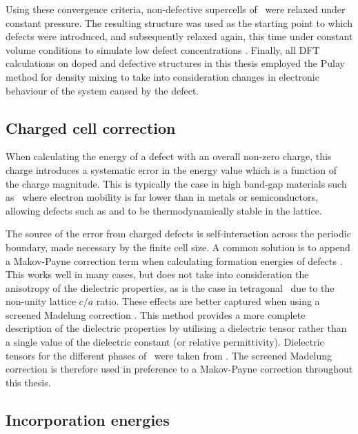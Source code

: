 Using these convergence criteria, non-defective supercells of \zirconia\ were relaxed under constant pressure. The resulting structure was used as the starting point to which defects were introduced, and subsequently relaxed again, this time under constant volume conditions to simulate low defect concentrations \cite{Murphy2014, Bell2015}. Finally, all DFT calculations on doped and defective structures in this thesis employed the Pulay method for density mixing \cite{Pulay1980} to take into consideration changes in electronic behaviour of the system caused by the defect.

\subsection{Charged cell correction} \label{charged_cell_correction}

When calculating the energy of a defect with an overall non-zero charge, this charge introduces a systematic error in the energy value which is a function of the charge magnitude. This is typically the case in high band-gap materials such as \zirconia\ where electron mobility is far lower than in metals or semiconductors, allowing defects such as  and  to be thermodynamically stable in the lattice. 

The source of the error from charged defects is self-interaction across the periodic boundary, made necessary by the finite cell size. A common solution is to append a Makov-Payne correction term when calculating formation energies of defects \cite{Makov1995, Makov1996}. This works well in many cases, but does not take into consideration the anisotropy of the dielectric properties, as is the case in tetragonal \zirconia\ due to the non-unity lattice $c/a$ ratio. These effects are better captured when using a screened Madelung correction \cite{Murphy2013}. This method provides a more complete description of the dielectric properties by utilising a dielectric tensor rather than a single value of the dielectric constant (or relative permittivity). Dielectric tensors for the different phases of \zirconia\ were taken from \cite{Zhao2002a, Zhao2002}. The screened Madelung correction is therefore used in preference to a Makov-Payne correction throughout this thesis.

\subsection{Incorporation energies}

